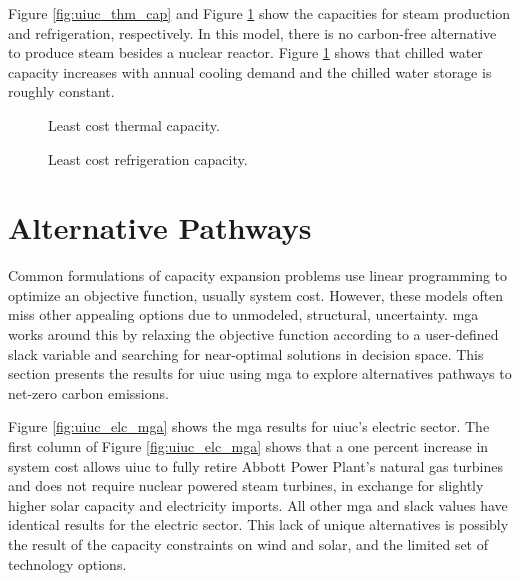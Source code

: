 Figure \ref{fig:uiuc_thm_cap} and Figure \ref{fig:uiuc_chw_cap} show the capacities
for steam production and refrigeration, respectively. In this model, there is no
carbon-free alternative to produce steam besides a nuclear reactor. Figure
\ref{fig:uiuc_chw_cap} shows that chilled water capacity increases with annual
cooling demand and the chilled water storage is roughly constant.

\begin{figure}[H]
  \begin{minipage}{0.48\textwidth}
    \captionsetup{type=figure}
    \centering
    \resizebox{\columnwidth}{!}{}
    \caption[]{Least cost thermal capacity.}
    \label{fig:uiuc_thm_cap}
  \end{minipage}
  \begin{minipage}{0.48\textwidth}
    \centering
    \resizebox{\columnwidth}{!}{}
    \caption[]{Least cost refrigeration capacity.}
    \label{fig:uiuc_chw_cap}
  \end{minipage}
\end{figure}

\section{Alternative Pathways}

Common formulations of capacity expansion problems use linear programming to optimize
an objective function, usually system cost. However, these models often miss
other appealing options due to unmodeled, structural, uncertainty. \gls{mga}
works around this by relaxing the objective function according to a user-defined
slack variable and searching for near-optimal solutions in decision space. This
section presents the results for \gls{uiuc} using \gls{mga} to explore alternatives
pathways to net-zero carbon emissions.

Figure \ref{fig:uiuc_elc_mga} shows the \gls{mga} results for \gls{uiuc}'s electric
sector. The first column of Figure \ref{fig:uiuc_elc_mga} shows that a one percent
increase in system cost allows \gls{uiuc} to fully retire Abbott Power Plant's
natural gas turbines and does not require nuclear powered steam turbines, in exchange
for slightly higher solar capacity and electricity imports. All other \gls{mga}
and slack values have identical results for the electric sector.
This lack of unique alternatives is possibly the result of the capacity constraints on
wind and solar, and the limited set of technology options.

